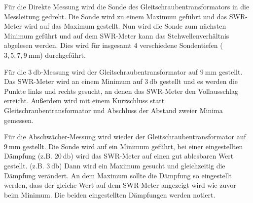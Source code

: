 Für die Direkte Messung wird die Sonde des Gleitschraubentransformators in die Messleitung gedreht.
Die Sonde wird zu einem Maximum geführt und das SWR-Meter wird auf das Maximum gestellt.
Nun wird die Sonde zum nächsten Minimum geführt und auf dem SWR-Meter kann das Stehwellenverhältnis abgelesen werden.
Dies wird für insgesamt 4 verschiedene Sondentiefen ($3,5,7,\SI{9}{\milli\meter}$) durchgeführt.

Für die $\SI{3}{\decibel}$-Messung wird der Gleitschraubentransformator auf $\SI{9}{\milli\meter}$ gestellt.
Das SWR-Meter wird an einem Minimum auf $\SI{3}{\decibel}$ gestellt
und es werden die Punkte links und rechts gesucht, an denen das SWR-Meter den Vollausschlag erreicht.
Außerdem wird mit einem Kurzschluss statt Gleitschraubentransformator und Abschluss der Abstand zweier Minima gemessen.

Für die Abschwächer-Messung wird wieder der Gleitschraubentransformator auf $\SI{9}{\milli\meter}$ gestellt.
Die Sonde wird auf ein Minimum geführt,
bei einer eingestellten Dämpfung (z.B. $\SI{20}{\decibel}$) wird das SWR-Meter auf einen gut ablesbaren Wert gestellt. (z.B. $\SI{3}{\decibel}$)
Dann wird ein Maximum gesucht und gleichzeitig die Dämpfung verändert. 
An dem Maximum sollte die Dämpfung so eingestellt werden, dass der gleiche Wert auf dem SWR-Meter angezeigt wird wie zuvor beim Minimum.
Die beiden eingestellten Dämpfungen werden notiert.